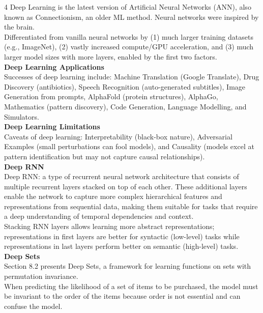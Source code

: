 \documentclass[8pt]{extarticle}
\begin{document}
\begin{multicols}{4}
Deep Learning is the latest version of Artificial Neural Networks (ANN), also known as Connectionism, an older ML method. Neural networks were inspired by the brain.\\
Differentiated from vanilla neural networks by (1) much larger training datasets (e.g., ImageNet), (2) vastly increased compute/GPU acceleration, and (3) much larger model sizes with more layers, enabled by the first two factors.\\
\vspace{2pt}\textbf{Deep Learning Applications}\\
Successes of deep learning include: Machine Translation (Google Translate), Drug Discovery (antibiotics), Speech Recognition (auto-generated subtitles), Image Generation from prompts, AlphaFold (protein structures), AlphaGo, Mathematics (pattern discovery), Code Generation, Language Modelling, and Simulators.\\
\vspace{2pt}\textbf{Deep Learning Limitations}\\
Caveats of deep learning: Interpretability (black-box nature), Adversarial Examples (small perturbations can fool models), and Causality (models excel at pattern identification but may not capture causal relationships).\\
\vspace{2pt}\textbf{Deep RNN}\\
Deep RNN: a type of recurrent neural network architecture that consists of multiple recurrent layers stacked on top of each other. These additional layers enable the network to capture more complex hierarchical features and representations from sequential data, making them suitable for tasks that require a deep understanding of temporal dependencies and context.\\
Stacking RNN layers allows learning more abstract representations; representations in first layers are better for syntactic (low-level) tasks while representations in last layers perform better on semantic (high-level) tasks.\\
\vspace{2pt}\textbf{Deep Sets}\\
Section 8.2 presents Deep Sets, a framework for learning functions on sets with permutation invariance.\\
When predicting the likelihood of a set of items to be purchased, the model must be invariant to the order of the items because order is not essential and can confuse the model.\\

\end{multicols}
\end{document}
